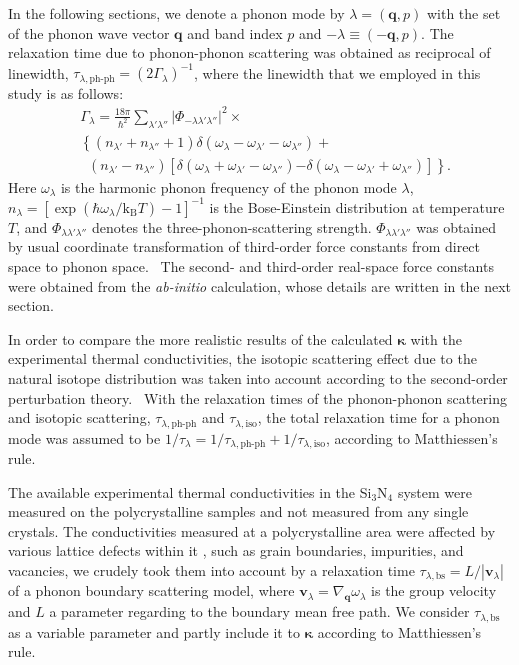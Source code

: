 \documentclass[twocolumn,amsmath,amssymb,a4paper,prb,superscriptaddress,floatfix]{revtex4-1}
\begin{document}
In the following sections, we denote a phonon mode by $\lambda=(\mathbf{q},p)$
with the set of the phonon wave vector $\mathbf{q}$ and band index $p$ and $-\lambda \equiv (-\mathbf{q},p)$. The
relaxation time due to phonon-phonon scattering was obtained as reciprocal of
linewidth, $\tau_{\lambda,\text{ph-ph}}=(2\Gamma_\lambda)^{-1}$, where the
linewidth that we employed in this study is as follows:
\begin{align}
 \label{eq:linewidth}
 &\Gamma_\lambda = \frac{18\pi}{\hbar^2}
  \sum_{\lambda' \lambda''}
  \bigl|\Phi_{-\lambda\lambda'\lambda''}\bigl|^2 \times \nonumber \\ 
 &\left\{ (n_{\lambda'} + n_{\lambda''}+1) 
   \delta(\omega_\lambda-\omega_{\lambda'}-\omega_{\lambda''}) \right.
   + \nonumber \\ 
 &\;\;(n_{\lambda'}-n_{\lambda''})
  \left[\delta(\omega_\lambda +\omega_{\lambda'}-\omega_{\lambda''})
 \right. 
 \left. -\left. \delta(\omega_\lambda - \omega_{\lambda'}+\omega_{\lambda''})
 \right]\right\}.
\end{align}
Here $\omega_\lambda$ is the harmonic phonon frequency of the phonon mode
$\lambda$, $n_\lambda=[\exp(\hbar\omega_\lambda/\mathrm{k_B}T)-1]^{-1}$ is
the Bose-Einstein distribution at temperature $T$, and
$\Phi_{\lambda\lambda'\lambda''}$ denotes the three-phonon-scattering strength.
$\Phi_{\lambda\lambda'\lambda''}$ was obtained by usual coordinate
transformation of third-order force constants from direct space to phonon
space.~\cite{phono3py} The second- and third-order real-space force constants
were obtained from the {\it ab-initio} calculation, whose details are written in the
next section.

In order to compare the more realistic results of the calculated $\boldsymbol{\kappa}$ with the
experimental thermal conductivities, the isotopic scattering effect due to the natural isotope
distribution was taken into account according to the second-order perturbation
theory.~\cite{tamura} With the relaxation times of the phonon-phonon scattering
and isotopic scattering, $\tau_{\lambda,\text{ph-ph}}$ and
$\tau_{\lambda,\text{iso}}$, the total relaxation time for a phonon mode was
assumed to be $1/\tau_{\lambda} = 1/\tau_{\lambda,\text{ph-ph}} +
1/\tau_{\lambda,\text{iso}}$, according to Matthiessen's rule.

The available experimental thermal conductivities in the Si$_3$N$_4$ system were
measured on the polycrystalline samples and not measured from any single
crystals. The conductivities measured at a polycrystalline area were affected
by various lattice defects within it , such as grain boundaries, impurities, and
vacancies, we crudely took them into account by a relaxation time
$\tau_{\lambda,\text{bs}}=L/|\mathbf{v}_\lambda|$ of a phonon boundary
scattering model, where $\mathbf{v}_\lambda = \nabla_{\mathbf{q}}\omega_\lambda$
is the group velocity and $L$ a parameter regarding to the boundary mean free
path. We consider $\tau_{\lambda,\text{bs}}$ as a variable parameter and partly
include it to $\boldsymbol{\kappa}$ according to Matthiessen's rule. 
\end{document}
